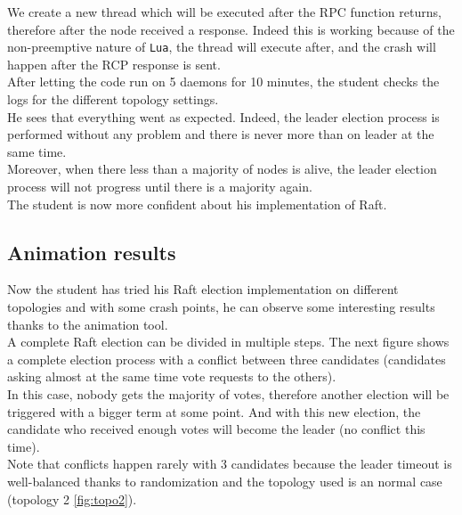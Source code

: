 \documentclass{eplmastersthesis}
\begin{document}
        We create a new thread which will be executed after the RPC function
        returns, therefore after the node received a response. Indeed this is
        working because of the non-preemptive nature of \texttt{Lua}, the thread
        will execute after, and the crash will happen after the RCP response is
        sent.\\

        After letting the code run on 5 daemons for 10 minutes, the student
        checks the logs for the different topology settings.\\
        He sees that everything went as expected. Indeed, the leader
        election process is performed without any problem and there is never
        more than on leader at the same time.\\
        Moreover, when there less than a majority of nodes is alive, the leader
        election process will not progress until there is a majority again.\\
        The student is now more confident about his implementation of Raft.

      \subsection{Animation results}

        Now the student has tried his Raft election implementation on
        different topologies and with some crash points, he can observe some
        interesting results thanks to the animation tool.\\
        A complete Raft election can be divided in multiple steps. The next
        figure shows a complete election process with a conflict between
        three candidates (candidates asking almost at the same time vote
        requests to the others).\\
        In this case, nobody gets the majority of votes, therefore another
        election will be triggered with a bigger term at some point.
        And with this new election, the candidate who received enough votes
        will become the leader (no conflict this time).\\
        Note that conflicts happen rarely with 3 candidates because the
        leader timeout is well-balanced thanks to randomization and the
        topology used is an normal case (topology 2 \ref{fig:topo2}).
\end{document}
